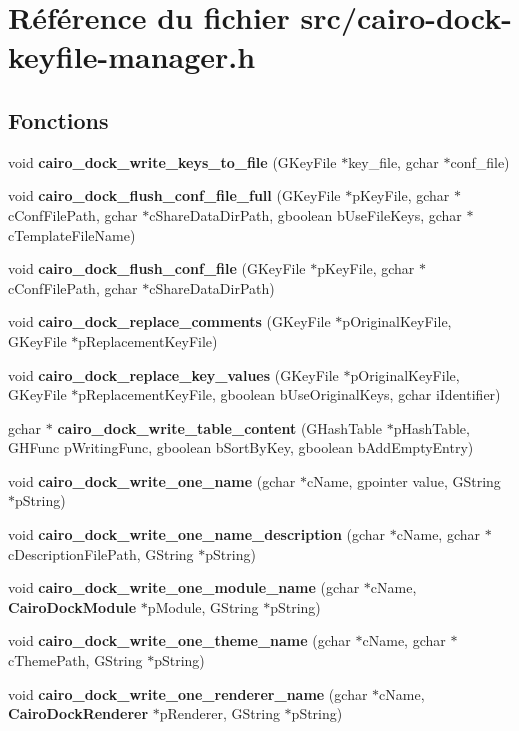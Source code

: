 \section{Référence du fichier src/cairo-dock-keyfile-manager.h}
\label{cairo-dock-keyfile-manager_8h}
\subsection*{Fonctions}
\begin{CompactItemize}
\item 
void {\bf cairo\_\-dock\_\-write\_\-keys\_\-to\_\-file} (GKeyFile $\ast$key\_\-file, gchar $\ast$conf\_\-file)
\item 
void {\bf cairo\_\-dock\_\-flush\_\-conf\_\-file\_\-full} (GKeyFile $\ast$pKeyFile, gchar $\ast$cConfFilePath, gchar $\ast$cShareDataDirPath, gboolean bUseFileKeys, gchar $\ast$cTemplateFileName)
\item 
void {\bf cairo\_\-dock\_\-flush\_\-conf\_\-file} (GKeyFile $\ast$pKeyFile, gchar $\ast$cConfFilePath, gchar $\ast$cShareDataDirPath)
\item 
void {\bf cairo\_\-dock\_\-replace\_\-comments} (GKeyFile $\ast$pOriginalKeyFile, GKeyFile $\ast$pReplacementKeyFile)
\item 
void {\bf cairo\_\-dock\_\-replace\_\-key\_\-values} (GKeyFile $\ast$pOriginalKeyFile, GKeyFile $\ast$pReplacementKeyFile, gboolean bUseOriginalKeys, gchar iIdentifier)
\item 
gchar $\ast$ {\bf cairo\_\-dock\_\-write\_\-table\_\-content} (GHashTable $\ast$pHashTable, GHFunc pWritingFunc, gboolean bSortByKey, gboolean bAddEmptyEntry)
\item 
void {\bf cairo\_\-dock\_\-write\_\-one\_\-name} (gchar $\ast$cName, gpointer value, GString $\ast$pString)
\item 
void {\bf cairo\_\-dock\_\-write\_\-one\_\-name\_\-description} (gchar $\ast$cName, gchar $\ast$cDescriptionFilePath, GString $\ast$pString)
\item 
void {\bf cairo\_\-dock\_\-write\_\-one\_\-module\_\-name} (gchar $\ast$cName, {\bf CairoDockModule} $\ast$pModule, GString $\ast$pString)
\item 
void {\bf cairo\_\-dock\_\-write\_\-one\_\-theme\_\-name} (gchar $\ast$cName, gchar $\ast$cThemePath, GString $\ast$pString)
\item 
void {\bf cairo\_\-dock\_\-write\_\-one\_\-renderer\_\-name} (gchar $\ast$cName, {\bf CairoDockRenderer} $\ast$pRenderer, GString $\ast$pString)

\end{CompactItemize}
